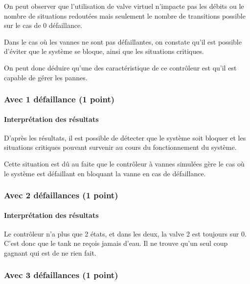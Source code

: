 \documentclass[a4paper]{book}
\begin{document}
On peut observer que l'utilisation de valve virtuel n'impacte pas les débits ou le nombre de situations redoutées mais seulement le nombre de transitions possible sur le cas de 0 défaillance.\

Dans le cas où les vannes ne sont pas défaillantes, on constate qu’il est possible d’éviter que le système se bloque, ainsi que les situations critiques.

On peut donc déduire qu’une des caractéristique de ce contrôleur est qu’il est capable de gérer les pannes.\


\subsubsection{Avec 1 défaillance (1 point)}


%
%
%
\paragraph{Interprétation des résultats}

D’après les résultats, il est possible de détecter que le système soit bloquer et les situations critiques pouvant survenir au cours du fonctionnement du système.\

Cette situation est dû au faite que le contrôleur à vannes simulées gère le cas où le système est défaillant en bloquant la vanne en cas de défaillance.\

\subsubsection{Avec 2 défaillances (1 point)}


%
%
%
\paragraph{Interprétation des résultats}
Le contrôleur n'a plus que 2 états, et dans les deux, la valve 2 est toujours sur 0. C'est donc que le tank ne reçois jamais d'eau. Il ne trouve qu'un seul coup gagnant qui est de ne rien fait.\

\subsubsection{Avec 3 défaillances (1 point)}


%
%
%
\end{document}
